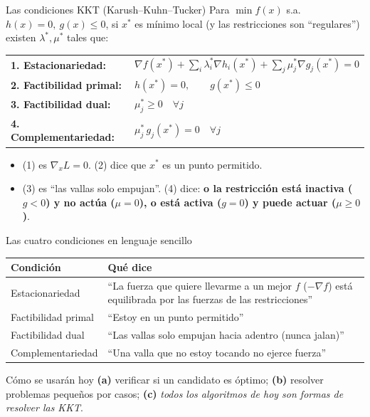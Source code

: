 \documentclass[aspectratio=169]{beamer}
\newcommand{\grad}{\nabla}
\newcommand{\xs}{x^\ast}
\begin{document}
\begin{frame}{Las condiciones KKT (Karush--Kuhn--Tucker)}
  Para $\min f(x)$ s.a.\ $h(x)=0,\ g(x)\le0$, si $\xs$ es mínimo local (y las restricciones son ``regulares'') existen $\lambda^\ast,\mu^\ast$ tales que:
  \begin{block}{}
    \begin{tabular}{@{}ll@{}}
      \textbf{1. Estacionariedad:} & $\grad f(\xs)+\sum_i\lambda_i^\ast\grad h_i(\xs)+\sum_j\mu_j^\ast\grad g_j(\xs)=0$\\[3pt]
      \textbf{2. Factibilidad primal:} & $h(\xs)=0,\qquad g(\xs)\le0$\\[3pt]
      \textbf{3. Factibilidad dual:} & $\mu_j^\ast\ge0\quad\forall j$\\[3pt]
      \textbf{4. Complementariedad:} & $\mu_j^\ast\,g_j(\xs)=0\quad\forall j$\\
    \end{tabular}
  \end{block}
  \begin{itemize}
    \item (1) es $\grad_xL=0$. (2) dice que $\xs$ es un punto permitido.
    \item (3) es ``las vallas solo empujan''. (4) dice: \textbf{o la restricción está inactiva ($g<0$) y no actúa ($\mu=0$), o está activa ($g=0$) y puede actuar ($\mu\ge0$)}.
  \end{itemize}
\end{frame}

\begin{frame}{Las cuatro condiciones en lenguaje sencillo}
  \centering\small
  \begin{tabular}{p{3.6cm}p{8.8cm}}
    \toprule
    \textbf{Condición} & \textbf{Qué dice}\\
    \midrule
    Estacionariedad & ``La fuerza que quiere llevarme a un mejor $f$ ($-\grad f$) está equilibrada por las fuerzas de las restricciones''\\[4pt]
    Factibilidad primal & ``Estoy en un punto permitido''\\[4pt]
    Factibilidad dual & ``Las vallas solo empujan hacia adentro (nunca jalan)''\\[4pt]
    Complementariedad & ``Una valla que no estoy tocando no ejerce fuerza''\\
    \bottomrule
  \end{tabular}
  \vspace{0.3cm}

  \normalsize
  \begin{alertblock}{Cómo se usarán hoy}
    \textbf{(a)} verificar si un candidato es óptimo; \textbf{(b)} resolver problemas pequeños por casos; \textbf{(c)} \emph{todos los algoritmos de hoy son formas de resolver las KKT}.
  \end{alertblock}
\end{frame}
\end{document}
